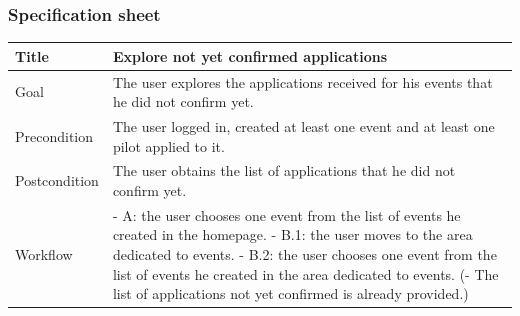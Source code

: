 \documentclass{beamer}
\begin{document}
\begin{frame}
    \frametitle{Specification sheet}
    \begin{table}
        \tiny
        \begin{tabular}{|p{2cm}|p{6cm}|}
        \hline
        Title & \textbf{Explore not yet confirmed applications} \\
        \hline
        Goal & The user explores the applications received for his events that he did not confirm yet. \\
        \hline
        Precondition & The user logged in, created at least one event and at least one pilot applied to it.\\
        \hline
        Postcondition & The user obtains the list of applications that he did not confirm yet. \\
        \hline
        Workflow &
        - A: the user chooses one event from the list of events he created in the homepage. \newline
        - B.1: the user moves to the area dedicated to events. \newline
        - B.2: the user chooses one event from the list of events he created in the area dedicated to events. \newline
        (- The list of applications not yet confirmed is already provided.) \\
        \hline
        \end{tabular}
\end{table}
\end{frame}


\end{document}
